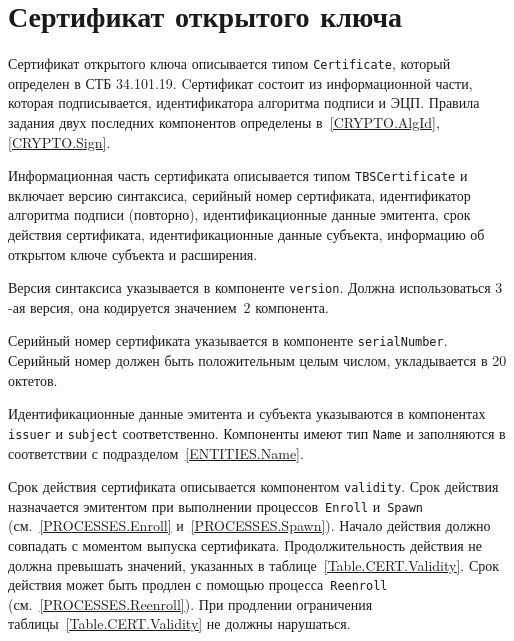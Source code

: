 \section{Сертификат открытого ключа}\label{FMT.Cert}

Сертификат открытого ключа описывается типом 
\texttt{Certificate}, который определен в СТБ 34.101.19.
%
Cертификат состоит из информационной части, которая 
подписывается, идентификатора алгоритма подписи и ЭЦП. 
Правила задания двух последних компонентов определены 
в~\ref{CRYPTO.AlgId}, \ref{CRYPTO.Sign}.

Информационная часть сертификата описывается типом 
\texttt{TBSCertificate} и включает версию синтаксиса, 
серийный номер сертификата, идентификатор алгоритма подписи (повторно), 
идентификационные данные эмитента, срок действия сертификата, 
идентификационные данные субъекта, информацию об открытом ключе 
субъекта и расширения. 

Версия синтаксиса указывается в компоненте \texttt{version}.
Должна использоваться $3$-ая версия, она кодируется значением~$2$
компонента.

Серийный номер сертификата указывается в компоненте \texttt{serialNumber}.
Серийный номер должен быть положительным целым числом, 
 укладывается в 20 октетов.

Идентификационные данные эмитента и субъекта указываются в компонентах 
\texttt{issuer} и \texttt{subject} соответственно. Компоненты 
имеют тип \texttt{Name} и заполняются в соответствии с 
подразделом~\ref{ENTITIES.Name}. 

Срок действия сертификата описывается компонентом 
\texttt{validity}. Срок действия назначается эмитентом
при выполнении процессов~\texttt{Enroll} и~\texttt{Spawn}
(см.~\ref{PROCESSES.Enroll} и~\ref{PROCESSES.Spawn}). 
Начало действия должно совпадать с моментом выпуска сертификата. 
Продолжительность действия не должна превышать значений, указанных в 
таблице~\ref{Table.CERT.Validity}. 
%
Срок действия может быть продлен с помощью процесса~\texttt{Reenroll}
(см.~\ref{PROCESSES.Reenroll}). При продлении ограничения
таблицы~\ref{Table.CERT.Validity} не должны нарушаться.

